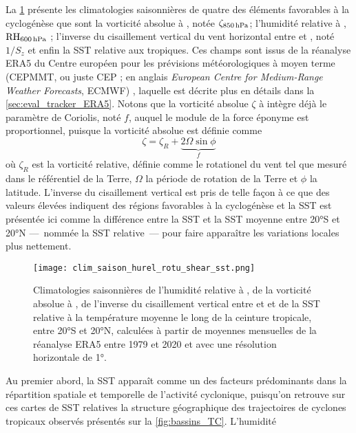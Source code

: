 \documentclass[../main.tex]{subfiles}
\begin{document}
La \cref{fig:clim_ingredients} présente les climatologies saisonnières de quatre des éléments favorables à la cyclogénèse que sont la vorticité absolue à
, notée $\zeta_{\text{\hPa{850}}}$; l'humidité relative à , $\text{RH}_{\text{\hPa{600}}}$ ; l'inverse du cisaillement vertical du vent
horizontal entre  et , noté $1/S_z$ et enfin la SST relative aux tropiques. Ces champs sont issus de la réanalyse ERA5 du Centre européen pour
les prévisions météorologiques à moyen terme (CEPMMT, ou juste CEP ; en anglais \textit{European Centre for Medium-Range Weather Forecasts}, ECMWF)
\parencite{hersbach_era5_2020}, laquelle est décrite plus en détails dans la \cref{sec:eval_tracker_ERA5}. Notons que la vorticité absolue $\zeta$ à  intègre
déjà le paramètre de Coriolis, noté $f$, auquel le module de la force éponyme est proportionnel, puisque la vorticité absolue est définie comme
\begin{equation*}
    \zeta = \zeta_R + \underbrace{2 \Omega \sin \phi}_{f}
\end{equation*}
\noindent où $\zeta_R$ est la vorticité relative, définie comme le rotationel du vent tel que mesuré dans le référentiel de la Terre, $\Omega$ la période de
rotation de la Terre et $\phi$ la latitude. L'inverse du cisaillement vertical est pris de telle façon à ce que des valeurs élevées indiquent des régions
favorables à la cyclogénèse et la SST est présentée ici comme la différence entre la SST et la SST moyenne entre \ang{20}S et \ang{20}N
---~nommée la SST relative~--- pour faire apparaître les variations locales plus nettement.
%
\begin{figure}[tp]
    \centering
    \texttt{[image: clim\_saison\_hurel\_rotu\_shear\_sst.png]}
    \caption{Climatologies saisonnières de l'humidité relative à , de la vorticité absolue à , de l'inverse du cisaillement vertical entre
     et  et de la SST relative à la température moyenne le long de la ceinture tropicale, entre \ang{20}S et \ang{20}N, calculées à partir de
    moyennes mensuelles de la réanalyse ERA5 entre 1979 et 2020 et avec une résolution horizontale de \ang{1}.}
    \label{fig:clim_ingredients}
\end{figure}
%
Au premier abord, la SST apparaît comme un des facteurs prédominants dans la répartition spatiale et temporelle de l'activité cyclonique, puisqu'on retrouve sur
ces cartes de SST relatives la structure géographique des trajectoires de cyclones tropicaux observés présentés sur la \cref{fig:bassins_TC}. L'humidité
\end{document}
